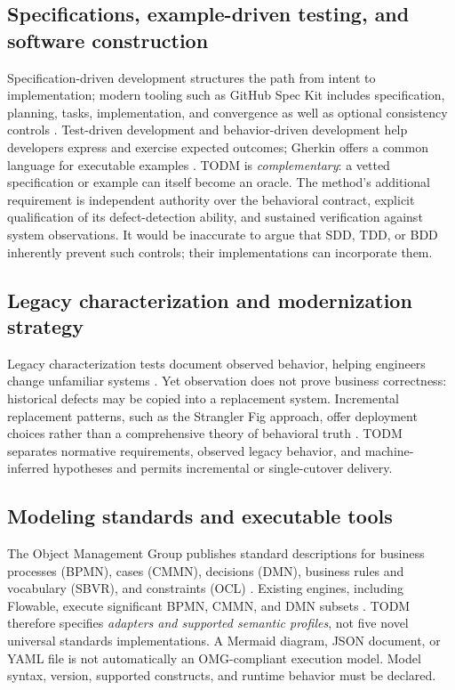 \documentclass[11pt,a4paper]{article}
\newcommand{\todm}{\textsc{TODM}}
\begin{document}
\subsection{Specifications, example-driven testing, and software construction}
Specification-driven development structures the path from intent to implementation; modern tooling such as GitHub Spec Kit includes specification, planning, tasks, implementation, and convergence as well as optional consistency controls \cite{github2026speckit}. Test-driven development and behavior-driven development help developers express and exercise expected outcomes; Gherkin offers a common language for executable examples \cite{cucumber2026}. \todm{} is \emph{complementary}: a vetted specification or example can itself become an oracle. The method's additional requirement is independent authority over the behavioral contract, explicit qualification of its defect-detection ability, and sustained verification against system observations. It would be inaccurate to argue that SDD, TDD, or BDD inherently prevent such controls; their implementations can incorporate them.

\subsection{Legacy characterization and modernization strategy}
Legacy characterization tests document observed behavior, helping engineers change unfamiliar systems \cite{feathers2004legacy}. Yet observation does not prove business correctness: historical defects may be copied into a replacement system. Incremental replacement patterns, such as the Strangler Fig approach, offer deployment choices rather than a comprehensive theory of behavioral truth \cite{fowler2004strangler}. \todm{} separates normative requirements, observed legacy behavior, and machine-inferred hypotheses and permits incremental or single-cutover delivery.

\subsection{Modeling standards and executable tools}
The Object Management Group publishes standard descriptions for business processes (BPMN), cases (CMMN), decisions (DMN), business rules and vocabulary (SBVR), and constraints (OCL) \cite{omg2014bpmn,omg2016cmmn,omg2024dmn,omg2019sbvr,omg2014ocl}. Existing engines, including Flowable, execute significant BPMN, CMMN, and DMN subsets \cite{flowable2026}. TODM therefore specifies \emph{adapters and supported semantic profiles}, not five novel universal standards implementations. A Mermaid diagram, JSON document, or YAML file is not automatically an OMG-compliant execution model. Model syntax, version, supported constructs, and runtime behavior must be declared.
\end{document}
